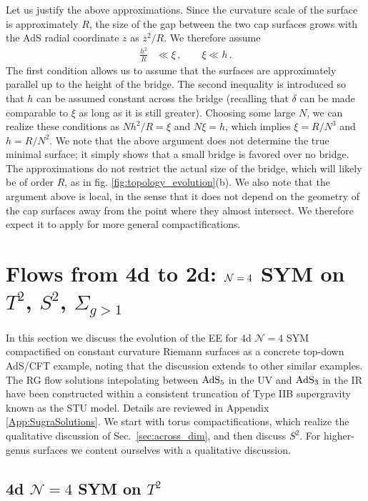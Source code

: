 \documentclass[11 pt]{article}
\begin{document}
Let us justify the above approximations. Since the curvature scale of the surface is approximately $R$, the size of the gap between the two cap surfaces grows with the AdS radial coordinate $z$ as $z^2/R$. We therefore assume
\begin{align}
    \frac{h^2}{R} &\ll \xi\,, \qquad
    \xi \ll h\,.
\end{align}
The first condition allows us to assume that the surfaces are approximately parallel up to the height of the bridge.
The second inequality is introduced so that $h$ can be assumed constant across the bridge (recalling that $\delta$ can be made comparable to $\xi$ as long as it is still greater). Choosing some large $N$, we can realize these conditions as
$N h^2/R = \xi$ and $N\xi = h$,
which implies $\xi = R/N^3$ and $h=R/N^2$. We note that the above argument does not determine the true minimal surface; it simply shows that a small bridge is favored over no bridge. The approximations do not restrict the actual size of the bridge, which will likely be of order $R$, as in fig. \ref{fig:topology_evolution}(b).
We also note that the argument above is local, in the sense that it does not depend on the geometry of the cap surfaces away from the point where they almost intersect. We therefore expect it to apply for more general compactifications.




\section{Flows from 4d to 2d: ${\cal N}=4$ SYM on $T^2$, $S^2$, $\Sigma_{g>1}$}\label{sec:evolver_results}

In this section we discuss the evolution of the EE for  4d $\mathcal N=4$ SYM compactified on constant curvature Riemann surfaces as a concrete top-down AdS/CFT example, noting that the discussion extends to other similar examples.
The RG flow solutions intepolating between $\rm AdS_5$ in the UV and $\rm AdS_3$ in the IR have been constructed within a consistent truncation of Type IIB supergravity known as the STU model. Details are reviewed in Appendix \ref{App:SugraSolutions}.
We start with torus compactifications, which realize the qualitative discussion of Sec.~\ref{sec:across_dim}, and then discuss $S^2$. For higher-genus surfaces we content ourselves with a qualitative discussion.
 
\subsection{4d $\mathcal N=4$ SYM on $T^2$}\label{Subsect:ThinTorus}
\end{document}
